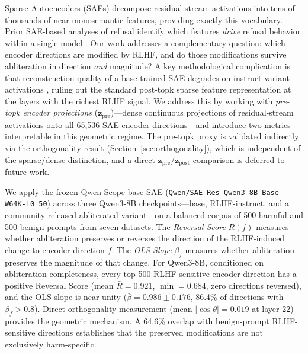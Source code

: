 \documentclass[11pt,letterpaper]{article}
\begin{document}
Sparse Autoencoders (SAEs) \citep{Elhage2022,Bricken2023,Gao2024,Templeton2024} decompose
residual-stream activations into tens of thousands of near-monosemantic features, providing exactly
this vocabulary. Prior SAE-based analyses of refusal identify which features \emph{drive} refusal
behavior within a single model \citep{Yeo2025,Kim2026}. Our work addresses a complementary question:
which encoder directions are modified by RLHF, and do those modifications survive abliteration in
direction \emph{and} magnitude? A key methodological complication is that reconstruction quality of
a base-trained SAE degrades on instruct-variant activations \citep{Chopra2026,Li2025}, ruling out
the standard post-topk sparse feature representation at the layers with the richest RLHF signal. We
address this by working with \emph{pre-topk encoder projections} ($\mathbf{z}_{\text{pre}}$)---dense
continuous projections of residual-stream activations onto all 65,536 SAE encoder directions---and
introduce two metrics interpretable in this geometric regime. The pre-topk proxy is validated
indirectly via the orthogonality result (Section~\ref{sec:orthogonality}), which is independent of
the sparse/dense distinction, and a direct $\mathbf{z}_{\text{pre}}$/$\mathbf{z}_{\text{post}}$
comparison is deferred to future work.

We apply the frozen Qwen-Scope base SAE (\texttt{Qwen/SAE-Res-Qwen3-8B-Base-W64K-L0\_50})
\citep{Deng2026} across three Qwen3-8B checkpoints---base, RLHF-instruct, and a community-released
abliterated variant---on a balanced corpus of 500 harmful and 500 benign prompts from seven datasets.
The \emph{Reversal Score} $R(f)$ measures whether abliteration preserves or reverses the direction of
the RLHF-induced change to encoder direction $f$. The \emph{OLS Slope} $\beta_f$ measures whether
abliteration preserves the magnitude of that change. For Qwen3-8B, conditioned on abliteration
completeness, every top-500 RLHF-sensitive encoder direction has a positive Reversal Score
(mean $\bar{R} = 0.921$, $\min = 0.684$, zero directions reversed), and the OLS slope is near unity
($\bar{\beta} = 0.986 \pm 0.176$, 86.4\% of directions with $\beta_f > 0.8$). Direct orthogonality
measurement (mean $|\cos\theta| = 0.019$ at layer 22) provides the geometric mechanism. A 64.6\%
overlap with benign-prompt RLHF-sensitive directions establishes that the preserved modifications are
not exclusively harm-specific.
\end{document}
